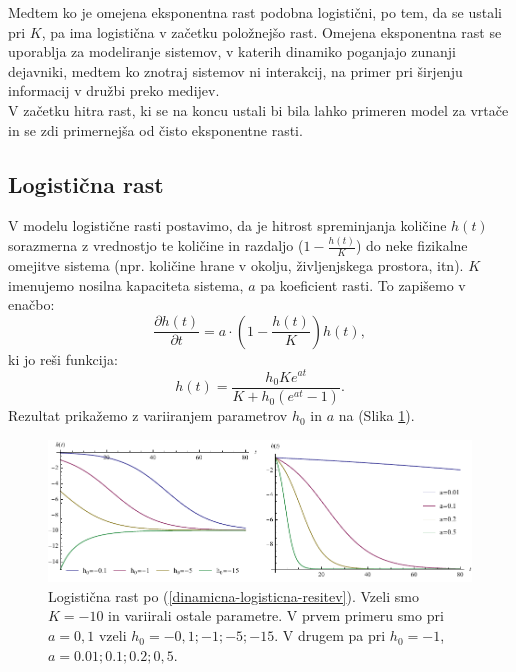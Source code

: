 \documentclass[a4paper, twoside, 12pt]{book}
\begin{document}
    Medtem ko je omejena eksponentna rast podobna logistični, po tem, da se ustali pri $K$, pa ima logistična v začetku položnejšo rast. Omejena eksponentna rast se uporablja za modeliranje sistemov, v katerih dinamiko poganjajo zunanji dejavniki, medtem ko znotraj sistemov ni interakcij, na primer pri širjenju informacij v družbi preko medijev.\\
V začetku hitra rast, ki se na koncu ustali bi bila lahko primeren model za vrtače in se zdi primernejša od čisto eksponentne rasti.


\subsection{Logistična rast}

V modelu logistične rasti postavimo, da je hitrost spreminjanja količine $h(t)$ sorazmerna z vrednostjo te količine in razdaljo ($1 - \frac{h(t)}{K}$) do neke fizikalne omejitve sistema (npr. količine hrane v okolju, življenjskega prostora, itn). $K$ imenujemo nosilna kapaciteta sistema, $a$ pa koeficient rasti. To zapišemo v enačbo:
    \begin{equation}
      \frac{\partial h(t)}{\partial t} = a \cdot \left( 1 - \frac{h(t)}{K} \right) h(t),
      \label{dinamicna-logisticna}
    \end{equation}
ki jo reši funkcija:
    \begin{equation}
      h(t) = \frac{h_0 K e^{a t}}{K + h_0 (e^{a t}-1)}.
      \label{dinamicna-logisticna-resitev}
    \end{equation}
Rezultat prikažemo z variiranjem parametrov $h_0$ in $a$ na (Slika \ref{fig:logisticna-rast}).
    \begin{figure}[h]
      \begin{center}
        \includegraphics[width=14cm]{slike/logisticna-rast}
      \end{center}
      \caption{Logistična rast po (\ref{dinamicna-logisticna-resitev}). Vzeli smo $K=-10$ in variirali ostale parametre. V prvem primeru smo pri $a=0,1$ vzeli $h_0=-0,1;-1;-5;-15$. V drugem pa pri $h_0=-1$, $a=0.01;0.1;0.2;0,5$.}
      \label{fig:logisticna-rast}
    \end{figure}
\end{document}
